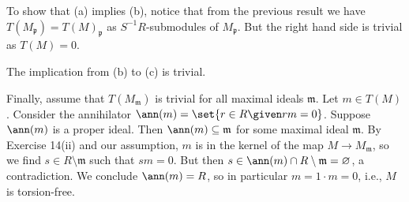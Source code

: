 To show that (a) implies (b), notice that from the previous result
we have $T(M_{\mathfrak{p}}) = T(M)_{\mathfrak{p}}$ as $S^{-1}R$-submodules
of $M_{\mathfrak{p}}$. But the right hand side is trivial as $T(M) = 0$.

The implication from (b) to (c) is trivial.

Finally, assume that $T(M_{\mathfrak{m}})$ is trivial for all maximal ideals
$\mathfrak{m}$. Let $m \in T(M)$. Consider the annihilator
$\ann(m) = \set{r \in R\given rm = 0}$. Suppose $\ann(m)$ is a proper
ideal. Then $\ann(m) \subseteq \mathfrak{m}$ for some maximal ideal
$\mathfrak{m}$. By Exercise 14(ii) and our assumption, $m$ is in the kernel
of the map $M\to M_{\mathfrak{m}}$, so we find $s \in R\setminus \mathfrak{m}$
such that $sm = 0$. But then $s \in \ann(m)\cap R\setminus \mathfrak{m} = \varnothing$,
a contradiction. We conclude $\ann(m) = R$, so in particular $m = 1\cdot m = 0$,
i.e., $M$ is torsion-free.

